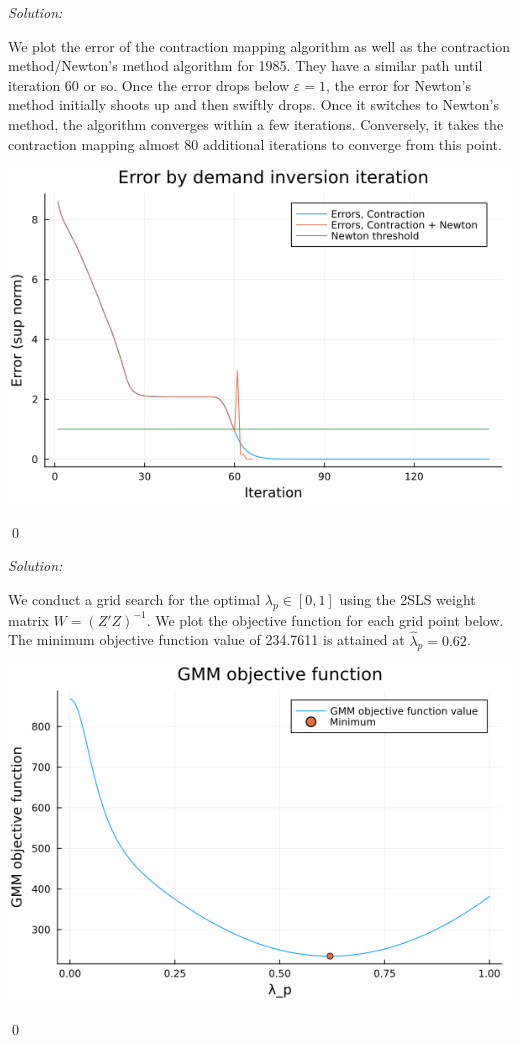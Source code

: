 \documentclass[12pt]{article}
\newenvironment{problem}[2][Problem]{\begin{trivlist}
\item[\hskip \labelsep {\bfseries #1}\hskip \labelsep {\bfseries #2.}]}{\end{trivlist}}
\newenvironment{sol}
    {\emph{Solution:}
    }
    {
    \qed
    }
\begin{document}
\begin{problem}{1}
\end{problem}
\begin{sol}
    We plot the error of the contraction mapping algorithm as well as the contraction method/Newton's method algorithm for 1985. They have a similar path until iteration 60 or so. Once the error drops below $\varepsilon = 1$, the error for Newton's method initially shoots up and then swiftly drops. Once it switches to Newton's method, the algorithm converges within a few iterations. Conversely, it takes the contraction mapping almost 80 additional iterations to converge from this point.
    \begin{center}
        \includegraphics[scale=0.5]{error_plot.png}
    \end{center} 
\end{sol}
\begin{problem}{2}
\end{problem}
\begin{sol}
    We conduct a grid search for the optimal $\lambda_p \in [0,1]$ using the 2SLS weight matrix $W = (Z' Z)^{-1}$. We plot the objective function for each grid point below. The minimum objective function value of 234.7611 is attained at $\hat{\lambda}_p = 0.62$. 
    \begin{center}
        \includegraphics[scale=0.5]{gmmplot.png}
    \end{center}
\end{sol}
\end{document}
